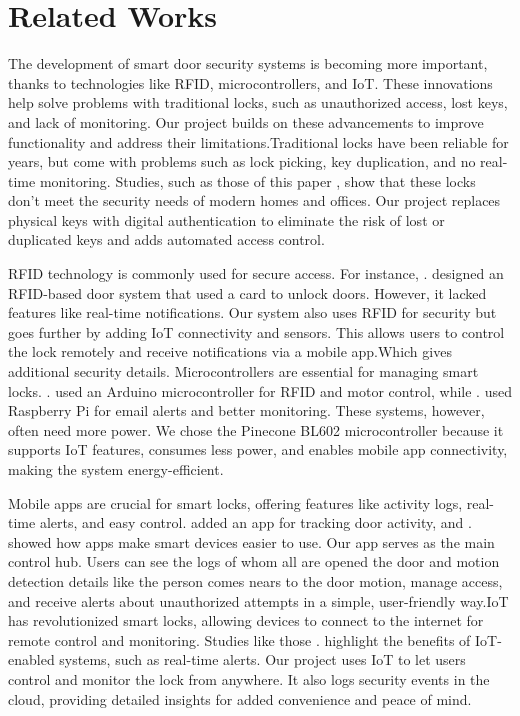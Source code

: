 \documentclass[USenglish,oneside,twocolumn]{article}
\begin{document}
    \section{Related Works}
	\label{sec:Related Works}

The development of smart door security systems is becoming more important, thanks to technologies like RFID, microcontrollers, and IoT. These innovations help solve problems with traditional locks, such as unauthorized access, lost keys, and lack of monitoring. Our project builds on these advancements to improve functionality and address their limitations.Traditional locks have been reliable for years, but come with problems such as lock picking, key duplication, and no real-time monitoring. Studies, such as those of this paper \cite{Shetty2020}, show that these locks don’t meet the security needs of modern homes and offices. Our project replaces physical keys with digital authentication to eliminate the risk of lost or duplicated keys and adds automated access control.

RFID technology is commonly used for secure access. For instance, \cite{Ortiz2021}. designed an RFID-based door system that used a card to unlock doors. However, it lacked features like real-time notifications. Our system also uses RFID for security but goes further by adding IoT connectivity and sensors. This allows users to control the lock remotely and receive notifications via a mobile app.Which gives additional security details. Microcontrollers are essential for managing smart locks. \cite{Ortiz2021}. used an Arduino microcontroller for RFID and motor control, while \cite{Edozie2020}. used Raspberry Pi for email alerts and better monitoring. These systems, however, often need more power. We chose the Pinecone BL602 microcontroller because it supports IoT features, consumes less power, and enables mobile app connectivity, making the system energy-efficient.

Mobile apps are crucial for smart locks, offering features like activity logs, real-time alerts, and easy control.\cite{Edozie2020} added an app for tracking door activity, and \cite{Tewari2021}. showed how apps make smart devices easier to use. Our app serves as the main control hub. Users can see the logs of whom all are opened the door and motion detection details like the person comes nears to the door motion, manage access, and receive alerts about unauthorized attempts in a simple, user-friendly way.IoT has revolutionized smart locks, allowing devices to connect to the internet for remote control and monitoring. Studies like those \cite{Edozie2020}. highlight the benefits of IoT-enabled systems, such as real-time alerts. Our project uses IoT to let users control and monitor the lock from anywhere. It also logs security events in the cloud, providing detailed insights for added convenience and peace of mind.
\end{document}
